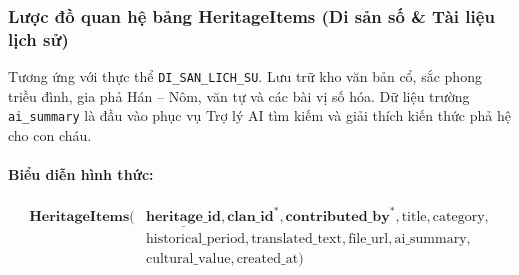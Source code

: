 \subsubsection{Lược đồ quan hệ bảng HeritageItems (Di sản số \& Tài liệu lịch sử)}
Tương ứng với thực thể \texttt{DI\_SAN\_LICH\_SU}. Lưu trữ kho văn bản cổ, sắc phong triều đình, gia phả Hán -- Nôm, văn tự và các bài vị số hóa. Dữ liệu trường \texttt{ai\_summary} là đầu vào phục vụ Trợ lý AI tìm kiếm và giải thích kiến thức phả hệ cho con cháu.

\paragraph{Biểu diễn hình thức:}
\[
\begin{aligned}
\textbf{HeritageItems}\big(
&\underline{\textbf{heritage\_id}}, \textbf{clan\_id}^*, \textbf{contributed\_by}^*, \text{title}, \text{category}, \\
&\text{historical\_period}, \text{translated\_text}, \text{file\_url}, \text{ai\_summary}, \\
&\text{cultural\_value}, \text{created\_at}
\big)
\end{aligned}
\]

